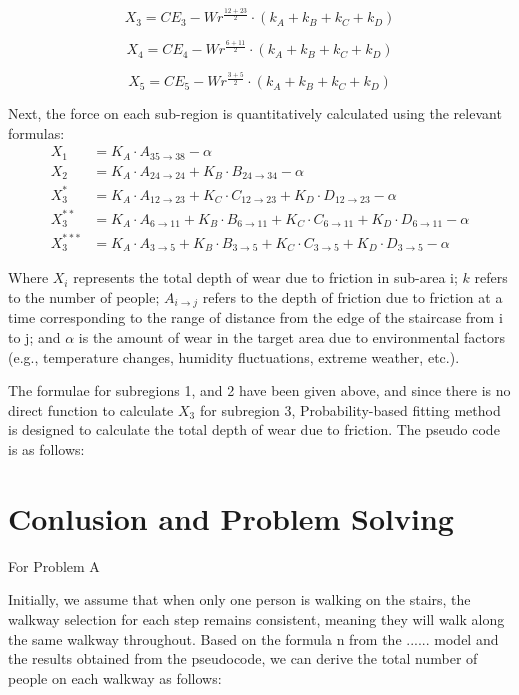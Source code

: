 \documentclass{mcmthesis}
\begin{document}
\[ X_3 = CE_3 - Wr^{\frac{12 + 23}{2}} \cdot \left(k_A + k_B + k_C + k_D\right) \]

\[ X_4 = CE_4 - Wr^{\frac{6 + 11}{2}} \cdot \left(k_A + k_B + k_C + k_D\right) \]

\[ X_5 = CE_5 - Wr^{\frac{3 + 5}{2}} \cdot \left(k_A + k_B + k_C + k_D\right) \]

 Next, the force on each sub-region is quantitatively calculated using the relevant formulas:
 \begin{align}
  X_1 &= K_A \cdot A_{35 \to 38} - \alpha \\
  X_2 &= K_A \cdot A_{24 \to 24} + K_B \cdot B_{24 \to 34} - \alpha \\
  X_3^* &= K_A \cdot A_{12 \to 23} + K_C \cdot C_{12 \to 23} + K_D \cdot D_{12 \to 23} - \alpha \\
  X_3^{**} &= K_A \cdot A_{6 \to 11} + K_B \cdot B_{6 \to 11} + K_C \cdot C_{6 \to 11} + K_D \cdot D_{6 \to 11} - \alpha \\
  X_3^{***} &= K_A \cdot A_{3 \to 5} + K_B \cdot B_{3 \to 5} + K_C \cdot C_{3 \to 5} + K_D \cdot D_{3 \to 5} - \alpha
  \end{align}
  

Where $X_i$ represents the total depth of wear due to friction in sub-area i; $k$ refers to the number of people; $A_{i \to j}$ refers to the depth of friction due to friction at a time corresponding to the range of distance from the edge of the staircase from i to j; and $\alpha$ is the amount of wear in the target area due to environmental factors (e.g., temperature changes, humidity fluctuations, extreme weather, etc.).

The formulae for subregions 1, and 2 have been given above, and since there is no direct function to calculate $X_3$ for subregion 3, Probability-based fitting method is designed to calculate the total depth of wear due to friction. The pseudo code is as follows:

\section{Conlusion and Problem Solving}
For Problem A

Initially, we assume that when only one person is walking on the stairs, the walkway selection for each step remains consistent, meaning they will walk along the same walkway throughout. Based on the formula n from the ...... model and the results obtained from the pseudocode, we can derive the total number of people on each walkway as follows:
\end{document}
